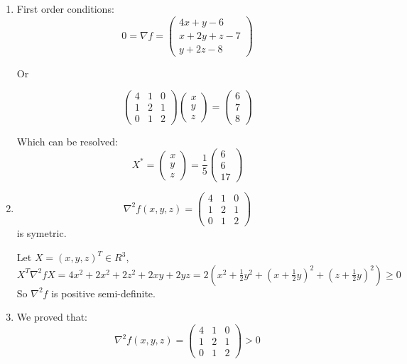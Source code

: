 \documentclass[12pt]{article}
\begin{document}
\begin{enumerate}
\item First order conditions:
\[
0 = \nabla f = \left( 
\begin{array}{c} 
4x + y - 6\\
x + 2y + z - 7 \\
y + 2z - 8
\end{array}
\right)
\]

Or 

\[
\left( 
\begin{array}{ccc} 
4&1&0\\
1&2&1 \\
0&1&2
\end{array}
\right)
\left( 
\begin{array}{c} 
x\\y\\z
\end{array}
\right)
=
\left( 
\begin{array}{c} 
6\\7\\8
\end{array}
\right)
\]


Which can be resolved:
\[
X^* = 
\left( 
\begin{array}{c} 
x\\y\\z
\end{array}
\right)
=
\frac15
\left( 
\begin{array}{c} 
6\\6\\17
\end{array}
\right)
\]


\item 

\[
\nabla^2 f(x,y,z) = \left(
\begin{array}{ccc}
4 & 1 & 0 \\
1 & 2 & 1 \\
0 & 1 & 2
\end{array}
\right)
\]
is symetric.


Let $X = (x, y, z)^T \in R^3$, 
$X^T\nabla^2fX = 4x^2 + 2x^2 + 2z^2 + 2 xy + 2 yz = 2(  x^2 + \frac12 y^2 + (x+\frac12 y)^2 + (z+\frac12 y)^2 ) \ge 0$ 
So $\nabla^2 f$ is positive semi-definite.

\item 

We proved that:
\[
\nabla^2 f(x,y,z) = \left(
\begin{array}{ccc}
4 & 1 & 0 \\
1 & 2 & 1 \\
0 & 1 & 2
\end{array}
\right) > 0
\]


\end{enumerate}
\end{document}

